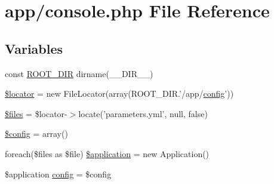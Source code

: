 \hypertarget{console_8php}{\section{app/console.php File Reference}
\label{console_8php}
}
\subsection*{Variables}
\begin{DoxyCompactItemize}
\item 
const \hyperlink{console_8php_a377942368503b6977376ce180c12aeef}{R\-O\-O\-T\-\_\-\-D\-I\-R} dirname(\-\_\-\-\_\-\-D\-I\-R\-\_\-\-\_\-)
\item 
\hyperlink{console_8php_a419ed0241456843e2a5cfb383bfa7bdd}{\$locator} = new File\-Locator(array(R\-O\-O\-T\-\_\-\-D\-I\-R.'/app/\hyperlink{console_8php_ab3995301e58c6128ab5f58199b9c97f0}{config}'))
\item 
\hyperlink{console_8php_a9590b15215a21e9b42eb546aeef79704}{\$files} = \$locator-\/$>$locate('parameters.\-yml', null, false)
\item 
\hyperlink{console_8php_a49c7011be9c979d9174c52a8b83e5d8e}{\$config} = array()
\item 
foreach(\$files as \$file) \hyperlink{console_8php_a7242967b6822c078a655d9523d6b655e}{\$application} = new Application()
\item 
\$application \hyperlink{console_8php_ab3995301e58c6128ab5f58199b9c97f0}{config} = \$config
\end{DoxyCompactItemize}


